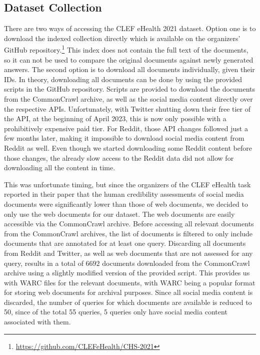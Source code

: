 \subsection{Dataset Collection}
There are two ways of accessing the CLEF eHealth 2021 dataset.
Option one is to download the indexed collection directly which is available on the organizers' GitHub repository.\footnote{\url{https://github.com/CLEFeHealth/CHS-2021}}
This index does not contain the full text of the documents, so it can not be used to compare the original documents against newly generated answers.
The second option is to download all documents individually, given their IDs.
In theory, downloading all documents can be done by using the provided scripts in the GitHub repository.
Scripts are provided to download the documents from the CommonCrawl archive, as well as the social media content directly over the respective APIs.
Unfortunately, with Twitter shutting down their free tier of the API, at the beginning of April 2023, this is now only possible with a prohibitively expensive paid tier.
For Reddit, those API changes followed just a few months later, making it impossible to download social media content from Reddit as well.
Even though we started downloading some Reddit content before those changes, the already slow access to the Reddit data did not allow for downloading all the content in time.

This was unfortunate timing, but since the organizers of the CLEF eHealth task reported in their paper that the human credibility assessments of social media documents were significantly lower than those of web documents, we decided to only use the web documents for our dataset.
The web documents are easily accessible via the CommonCrawl archive.
Before accessing all relevant documents from the CommonCrawl archives, the list of documents is filtered to only include documents that are annotated for at least one query.
Discarding all documents from Reddit and Twitter, as well as web documents that are not assessed for any query, results in a total of $6692$ documents downloaded from the CommonCrawl archive using a slightly modified version of the provided script.
This provides us with WARC files for the relevant documents, with WARC being a popular format for storing web documents for archival purposes.
Since all social media content is discarded, the number of queries for which documents are available is reduced to 50, since of the total 55 queries, 5 queries only have social media content associated with them.

